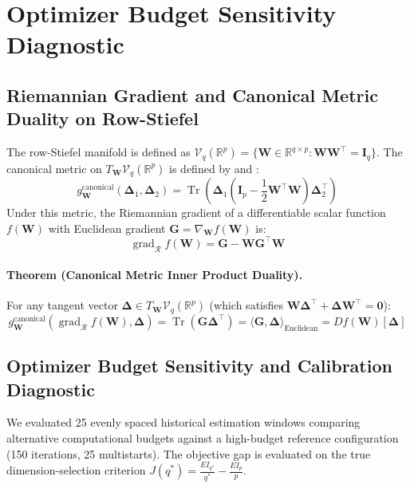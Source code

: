 \documentclass[12pt]{article}
\begin{document}
\section{Optimizer Budget Sensitivity Diagnostic}
\label{app:stiefel_opt}

\subsection{Riemannian Gradient and Canonical Metric Duality on Row-Stiefel}
The row-Stiefel manifold is defined as $\mathcal{V}_q(\mathbb{R}^p) = \{ \mathbf{W} \in \mathbb{R}^{q \times p} : \mathbf{W}\mathbf{W}^\top = \mathbf{I}_q \}$. The canonical metric on $T_{\mathbf{W}}\mathcal{V}_q(\mathbb{R}^p)$ is defined by \citet{edelman1998geometry} and \citet{absil2008optimization}:
\begin{equation}
g_{\mathbf{W}}^{\text{canonical}}(\mathbf{\Delta}_1, \mathbf{\Delta}_2) = \operatorname{Tr}\left( \mathbf{\Delta}_1 \left(\mathbf{I}_p - \frac{1}{2}\mathbf{W}^\top \mathbf{W}\right) \mathbf{\Delta}_2^\top \right)
\end{equation}
Under this metric, the Riemannian gradient of a differentiable scalar function $f(\mathbf{W})$ with Euclidean gradient $\mathbf{G} = \nabla_{\mathbf{W}} f(\mathbf{W})$ is:
\begin{equation}
\operatorname{grad}_{\mathcal{R}} f(\mathbf{W}) = \mathbf{G} - \mathbf{W}\mathbf{G}^\top \mathbf{W}
\end{equation}

\paragraph{Theorem (Canonical Metric Inner Product Duality).}
For any tangent vector $\mathbf{\Delta} \in T_{\mathbf{W}}\mathcal{V}_q(\mathbb{R}^p)$ (which satisfies $\mathbf{W}\mathbf{\Delta}^\top + \mathbf{\Delta}\mathbf{W}^\top = \mathbf{0}$):
\begin{equation}
g_{\mathbf{W}}^{\text{canonical}}(\operatorname{grad}_{\mathcal{R}} f(\mathbf{W}), \mathbf{\Delta}) = \operatorname{Tr}(\mathbf{G}\mathbf{\Delta}^\top) = \langle \mathbf{G}, \mathbf{\Delta} \rangle_{\text{Euclidean}} = D f(\mathbf{W})[\mathbf{\Delta}]
\end{equation}

\subsection{Optimizer Budget Sensitivity and Calibration Diagnostic}
We evaluated 25 evenly spaced historical estimation windows comparing alternative computational budgets against a high-budget reference configuration (150 iterations, 25 multistarts). The objective gap is evaluated on the true dimension-selection criterion $J(q^*) = \frac{EI_{q^*}}{q^*} - \frac{EI_p}{p}$.
\end{document}
